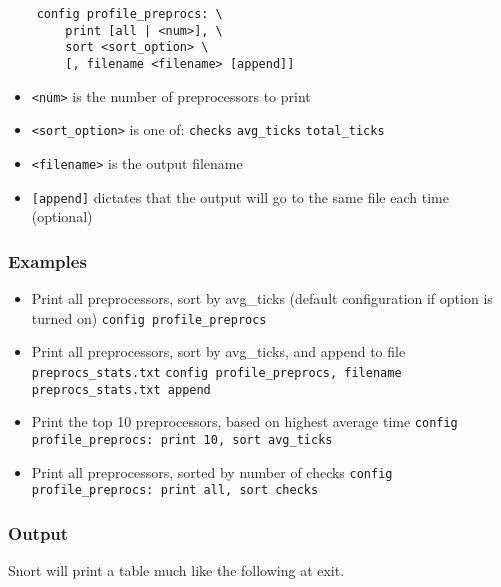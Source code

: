 \documentclass[english]{report}
\begin{document}
\begin{verbatim}
    config profile_preprocs: \
        print [all | <num>], \
        sort <sort_option> \
        [, filename <filename> [append]]
\end{verbatim}

\begin{itemize}
\item \texttt{<num>} is the number of preprocessors to print
\item \texttt{<sort\_option>} is one of:
\subitem \texttt{checks}
\subitem \texttt{avg\_ticks}
\subitem \texttt{total\_ticks}
\item \texttt{<filename>} is the output filename
\item \texttt{[append]} dictates that the output will go to the same file each time (optional)
\end{itemize}

\subsubsection{Examples}

\begin{itemize}

\item Print all preprocessors, sort by avg\_ticks (default configuration if
option is turned on)
\subitem \texttt{config profile\_preprocs}

\item Print all preprocessors, sort by avg\_ticks, and append to file
\texttt{preprocs\_stats.txt} 
\subitem \texttt{config profile\_preprocs, filename \texttt{preprocs\_stats.txt} append}

\item Print the top 10 preprocessors, based on highest average time
\subitem \texttt{config profile\_preprocs: print 10, sort avg\_ticks}

\item Print all preprocessors, sorted by number of checks
\subitem \texttt{config profile\_preprocs: print all, sort checks}

\end{itemize}

\subsubsection{Output}

Snort will print a table much like the following at exit.
\end{document}
